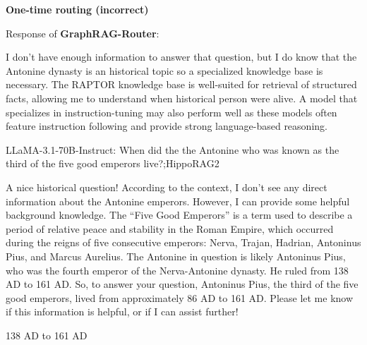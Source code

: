 \begin{tcolorbox}[
  casestudybox,
  width=\linewidth,
  title={\textbf{Question:} When did the the Antonine who was known as the third of the five good emperors live?\\[2mm]
  \textbf{Ground Truth:} 24 January 76 – 10 July 138}
]

\begin{tcolorbox}[schemestrip]
\textbf{One-time routing (incorrect)}
\end{tcolorbox}

Response of \textbf{GraphRAG-Router}: \par\medskip

I don't have enough information to answer that question, but I do know that the Antonine dynasty is an historical topic so a specialized knowledge base is necessary. The RAPTOR knowledge base is well-suited for retrieval of structured facts, allowing me to understand when historical person were alive. A model that specializes in instruction-tuning may also perform well as these models often feature instruction following and provide strong language-based reasoning. \par

{\raggedright
{}LLaMA-3.1-70B-Instruct: When did the the Antonine who was known as the third of the five good emperors live?;HippoRAG2\par
}

A nice historical question! According to the context, I don't see any direct information about the Antonine emperors. However, I can provide some helpful background knowledge. The ``Five Good Emperors'' is a term used to describe a period of relative peace and stability in the Roman Empire, which occurred during the reigns of five consecutive emperors: Nerva, Trajan, Hadrian, Antoninus Pius, and Marcus Aurelius. The Antonine in question is likely Antoninus Pius, who was the fourth emperor of the Nerva-Antonine dynasty. He ruled from 138 AD to 161 AD. So, to answer your question, Antoninus Pius, the third of the five good emperors, lived from approximately 86 AD to 161 AD. Please let me know if this information is helpful, or if I can assist further! \par

138 AD to 161 AD


\end{tcolorbox}
